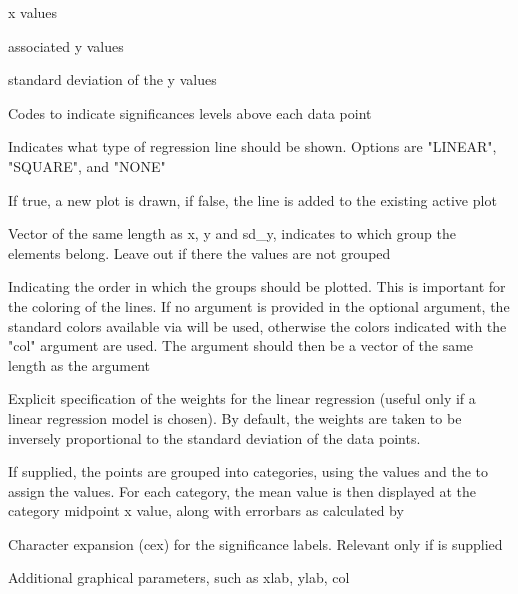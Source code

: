 \documentclass[a4paper]{book}
\begin{document}
\begin{Arguments}
\begin{ldescription}
\item[\code{x}] 
x values

\item[\code{y}] 
associated y values

\item[\code{sd\_y}] 
standard deviation of the y values


\item[\code{sig\_codes}] 
Codes to indicate significances levels above each data point


\item[\code{showlinreg}] 
Indicates what type of regression line should be shown. Options are "LINEAR", "SQUARE", and "NONE"


\item[\code{plot.new}] 
If true, a new plot is drawn, if false, the line is added to the existing active plot


\item[\code{groups}] 
Vector of the same length as x, y and sd\_y, indicates to which group the elements belong. Leave out if there the values are not grouped


\item[\code{group\_order}] 
Indicating the order in which the groups should be plotted. This is important for the coloring of the lines. If no  argument is provided in the optional argument, the standard colors
available via  will be used, otherwise the colors indicated with the "col" argument are used. The  argument should then be a vector of the same length as the  argument


\item[\code{weights}] 
Explicit specification of the weights for the linear regression (useful only if a linear regression model is chosen). By default, the weights are taken to be inversely proportional to the standard deviation of the data points.


\item[\code{category\_bounds}] If supplied, the points are grouped into categories, using the  values and the  to assign the  values. For each category, the mean  value is then displayed at the category midpoint x value, along with errorbars as calculated by 


\item[\code{sig.cex}] Character expansion (cex) for the significance labels. Relevant only if  is supplied


\item[\code{...}] 
Additional graphical parameters, such as xlab, ylab, col

\end{ldescription}
\end{Arguments}
\end{document}
